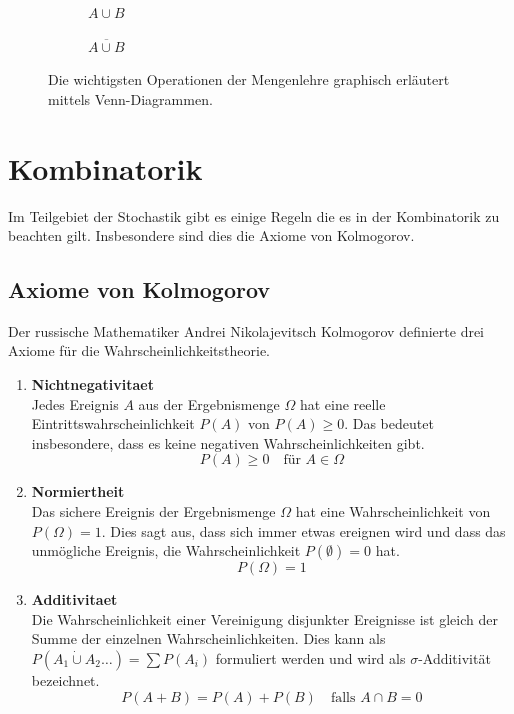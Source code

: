 \begin{figure}[h!]
	\rule[1mm]{0mm}{5mm}

	\begin{subfigure}[b]{0.45\textwidth}
		\centering
		\begin{venndiagram2sets}[tikzoptions={scale=0.7}]
			\fillA \fillB
		\end{venndiagram2sets}
		\caption{$A \cup B$}
	\end{subfigure}	
	\begin{subfigure}[b]{0.45\textwidth}
		\centering
		\begin{venndiagram2sets}[tikzoptions={scale=0.7}]
			\fillNotAorB
		\end{venndiagram2sets}
		\caption{$\overline{A \cup B}$}
	\end{subfigure}
	\caption{Die wichtigsten Operationen der Mengenlehre graphisch
	erläutert mittels Venn-Diagrammen.}
\end{figure}

\section{Kombinatorik}
Im Teilgebiet der Stochastik gibt es einige Regeln die es in der 
Kombinatorik zu beachten gilt. Insbesondere sind dies die 
\gls{Axiome von Kolmogorov}.

\subsection{Axiome von Kolmogorov}
Der russische Mathematiker Andrei Nikolajevitsch \gls{Kolmogorov} 
definierte drei Axiome für die Wahrscheinlichkeitstheorie.
\begin{enumerate}
	\item \textbf{\gls{Nichtnegativitaet}} \\
		Jedes Ereignis $A$ aus der Ergebnismenge $\Omega$ hat eine 
		reelle Eintrittswahrscheinlichkeit $P(A)$ von 
		$P(A) \geq 0$. Das bedeutet insbesondere, dass es 
		keine negativen Wahrscheinlichkeiten gibt.
		\[ P(A) \geq 0 \quad \text{für } A \in \Omega \] 
	\item \textbf{\gls{Normiertheit}} \\
		Das sichere Ereignis der Ergebnismenge $\Omega$ hat eine
		Wahrscheinlichkeit von $P(\Omega)=1$. Dies sagt aus, dass
		sich immer etwas ereignen wird und dass das unmögliche
		Ereignis, die Wahrscheinlichkeit $P(\emptyset)=0$ hat.
		\[ P(\Omega) = 1 \]
	\item \textbf{\gls{Additivitaet}} \\
		Die Wahrscheinlichkeit einer Vereinigung disjunkter 
		Ereignisse ist gleich der Summe der einzelnen 
		Wahrscheinlichkeiten. Dies kann als 
		$P(A_1 \dot\cup A_2  \dots ) = \sum P(A_i)$ 
		formuliert werden und wird als $\sigma$-Additivität
		bezeichnet.
		\[ P(A+B) = P(A)+P(B) \quad \text{falls } A \cap B = 0 \]
\end{enumerate}

